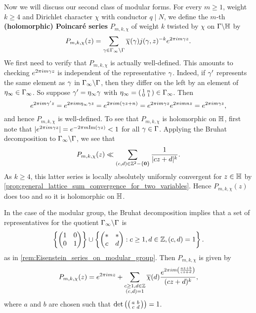       Now we will discuss our second class of modular forms. For every $m \ge 1$, weight $k \ge 4$ and Dirichlet character $\chi$ with conductor $q \mid N$, we define the $m$-th \textbf{(holomorphic) Poincar\'e series} $P_{m,k,\chi}$ of weight $k$ twisted by $\chi$ on $\Gamma\backslash\mathbb{H}$ by
      \[
        P_{m,k,\chi}(z) = \sum_{\gamma \in \Gamma_{\infty}\backslash\Gamma}\overline{\chi}(\gamma)j(\gamma,z)^{-k}e^{2\pi im\gamma z}.
      \]
      We first need to verify that $P_{m,k,\chi}$ is actually well-defined. This amounts to checking $e^{2\pi im\gamma z}$ is independent of the representative $\gamma$. Indeed, if $\gamma'$ represents the same element as $\gamma$ in $\Gamma_{\infty}\backslash\Gamma$, then they differ on the left by an element of $\eta_{\infty} \in \Gamma_{\infty}$. So suppose $\gamma' = \eta_{\infty}\gamma$ with $\eta_{\infty} = \begin{psmallmatrix} 1 & n \\ 0 & 1 \end{psmallmatrix} \in \Gamma_{\infty}$. Then
      \[
        e^{2\pi im\gamma' z} = e^{2\pi im\eta_{\infty}\gamma z} = e^{2\pi im(\gamma z+n)} = e^{2\pi im\gamma z}e^{2\pi imnz} = e^{2\pi im\gamma z},
      \]
      and hence $P_{m,k,\chi}$ is well-defined. To see that $P_{m,k,\chi}$ is holomorphic on $\mathbb{H}$, first note that $|e^{2\pi im\gamma z}| = e^{-2\pi m\mathrm{Im}(\gamma z)} < 1$ for all $\gamma \in \Gamma$. Applying the Bruhat decomposition to $\Gamma_{\infty}\backslash\Gamma$, we see that
      \[
        P_{m,k,\chi}(z) \ll \sum_{(c,d) \in \mathbb{Z}^{2}-\{\mathbf{0}\}}\frac{1}{|cz+d|^{k}}.
      \]
      As $k \ge 4$, this latter series is locally absolutely uniformly convergent for $z \in \mathbb{H}$ by \cref{prop:general_lattice_sum_convergence_for_two_variables}. Hence $P_{m,k,\chi}(z)$ does too and so it is holomorphic on $\mathbb{H}$.

      \begin{remark}
        In the case of the modular group, the Bruhat decomposition implies that a set of representatives for the quotient $\Gamma_{\infty}\backslash\Gamma$ is
      \[
        \left\{\begin{pmatrix} 1 & 0 \\ 0 & 1 \end{pmatrix}\right\} \cup \left\{\begin{pmatrix} \ast & \ast \\ c & d \end{pmatrix}:c \ge 1, d \in \mathbb{Z}, (c,d) = 1\right\}.
      \]
      as in \cref{rem:Eisenstein_series_on_modular_group}. Then $P_{m,k,\chi}$ is given by
        \[
          P_{m,k,\chi}(z) = e^{2\pi imz}+\sum_{\substack{c \ge 1, d \in \mathbb{Z} \\ (c,d) = 1}}\overline{\chi}(d)\frac{e^{2\pi im\left(\frac{az+b}{cz+d}\right)}}{(cz+d)^{k}},
        \]
        where $a$ and $b$ are chosen such that $\det\left(\begin{psmallmatrix} a & b \\ c & d \end{psmallmatrix}\right) = 1$.
      \end{remark}

